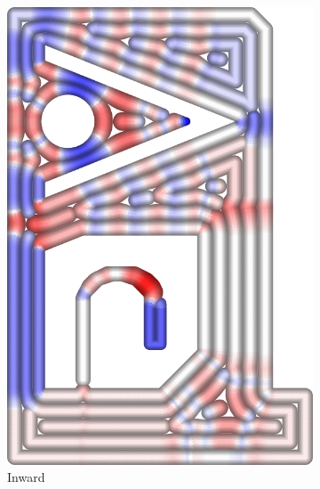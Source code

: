 \begin{figure}
\begin{subfigure}{\figwidth}
\includegraphics[width=\columnwidth]{sources/validation/gMAT_example/TEST_InwardDistributed_widths.png}
\caption{Inward}\label{TEST_InwardDistributed_accuracy}
\end{subfigure}
\begin{subfigure}{.04\columnwidth}\centering
\vspace{4.7cm}

\end{subfigure}
\end{figure}
